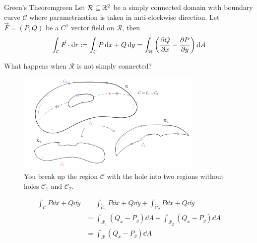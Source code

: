 \documentclass[../Analysis-3.tex]{subfiles}
\begin{document}
\begin{Thm}{Green's Theorem}{green}
  Let $\mathcal{R} \subseteq \mathbb{R}^2 $ be a simply connected domain with boundary curve $\mathcal{C}$ where parametrization is taken in anti-clockwise direction. Let $\vec{F} = (P,Q)$ be a $C^1$ vector field on $\mathcal{R}$, then
  \[
    \int_{\mathcal{C}} \vec{F} \cdot \dd r := \int_{\mathcal{C}} P \, \dd x + Q \, \dd y = \int_{\mathcal{R}} \left( \pdv{Q}{x} - \pdv{P}{y}\right) \dd A
  \]
\end{Thm}

What happens when $\mathcal{R}$ is not simply connected?
\begin{figure}[H]
  \centering
  \includegraphics[width=0.8\textwidth]{../figures/lec27.5.png}
  \caption{You break up the region $\mathcal{C}$ with the hole into two regions without holes $\mathcal{C}_1$ and $\mathcal{C}_2$.}
  \label{fig5:27}
\end{figure}
\begin{align*}
  \int_{\mathcal{C}} P \dd x + Q \dd y & = \int_{\tilde{\mathcal{C}}_1} P \dd x + Q \dd y + \int_{\tilde{\mathcal{C}}_2} P \dd x + Q \dd y \\
                                       & = \int_{\mathcal{R}_1} (Q_x - P_y) \dd A + \int_{\mathcal{R}_2} (Q_x - P_y) \dd A                 \\
                                       & = \int_{\mathcal{R}} (Q_x - P_y) \dd A
\end{align*}
\end{document}
